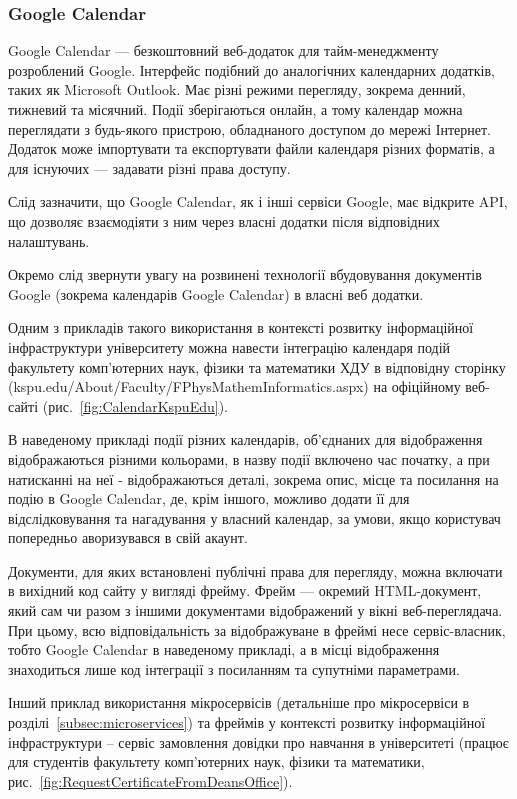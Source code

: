 \subsubsection{Google Calendar}

Google Calendar — безкоштовний веб-додаток для тайм-менеджменту розроблений Google. Інтерфейс подібний до аналогічних календарних додатків, таких як Microsoft Outlook. Має різні режими перегляду, зокрема денний, тижневий та місячний. Події зберігаються онлайн, а тому календар можна переглядати з будь-якого пристрою, обладнаного доступом до мережі Інтернет. Додаток може імпортувати та експортувати файли календаря різних форматів, а для існуючих — задавати різні права доступу. 

Слід зазначити, що Google Calendar, як і інші сервіси Google, має відкрите API, що дозволяє взаємодіяти з ним через власні додатки після відповідних налаштувань.

Окремо слід звернути увагу на розвинені технології вбудовування документів Google (зокрема календарів Google Calendar) в власні веб додатки. 

Одним з прикладів такого використання в контексті розвитку інформаційної інфраструктури університету можна навести інтеграцію календаря подій факультету комп'ютерних наук, фізики та математики ХДУ в відповідну сторінку (kspu.edu/About/Faculty/FPhysMathemInformatics.aspx) на офіційному веб-сайті (рис.~\ref{fig:CalendarKspuEdu}).


В наведеному прикладі події різних календарів, об'єднаних для відображення відображаються різними кольорами, в назву події включено час початку, а при натисканні на неї - відображаються деталі, зокрема опис, місце та посилання на подію в Google Calendar, де, крім іншого, можливо додати її для відслідковування та нагадування у власний календар, за умови, якщо користувач попередньо аворизувався в свій акаунт.

Документи, для яких встановлені публічні права для перегляду, можна включати в вихідний код сайту у вигляді фрейму. Фрейм — окремий HTML-документ, який сам чи разом з іншими документами відображений у вікні веб-переглядача. При цьому, всю відповідальність за відображуване в фреймі несе сервіс-власник, тобто Google Calendar в наведеному прикладі, а в місці відображення знаходиться лише код інтеграції з посиланням та супутніми параметрами.

Інший приклад використання мікросервісів (детальніше про мікросервіси в розділі~\ref{subsec:microservices}) та фреймів у контексті розвитку інформаційної інфраструктури  -- сервіс замовлення довідки про навчання в університеті (працює для студентів факультету комп'ютерних наук, фізики та математики, рис.~\ref{fig:RequestCertificateFromDeansOffice}).

